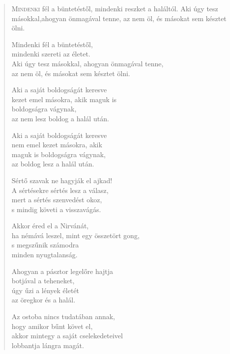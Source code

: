 
\begin{verse}

{\par%
\lettrine{M}{indenki} {\LettrineTextFont fél a büntetéstől,}\newline
mindenki reszket a haláltól.\newline
Aki úgy tesz másokkal,\verselinebreak ahogyan önmagával tenne,\verselinebreak
az nem öl, és másokat sem késztet ölni.
\par}

 Mindenki fél a büntetéstől,\\
mindenki szereti az életet.\\
Aki úgy tesz másokkal, ahogyan önmagával tenne,\\
az nem öl, és másokat sem késztet ölni.

 Aki a saját boldogságát keresve\\
kezet emel másokra, akik maguk is\\
boldogságra vágynak,\\
az nem lesz boldog a halál után.

 Aki a saját boldogságát keresve\\
nem emel kezet másokra, akik\\
maguk is boldogságra vágynak,\\
az boldog lesz a halál után.

 Sértő szavak ne hagyják el ajkad!\\
A sértésekre sértés lesz a válasz,\\
mert a sértés szenvedést okoz,\\
s mindig követi a visszavágás.

 Akkor éred el a Nirvánát,\\
ha némává leszel, mint egy összetört gong,\\
s megszűnik számodra\\
minden nyugtalanság.

 Ahogyan a pásztor legelőre hajtja\\
botjával a teheneket,\\
úgy űzi a lények életét\\
az öregkor és a halál.

 Az ostoba nincs tudatában annak,\\
hogy amikor bűnt követ el,\\
akkor mintegy a saját cselekedeteivel\\
lobbantja lángra magát.


\end{verse}

